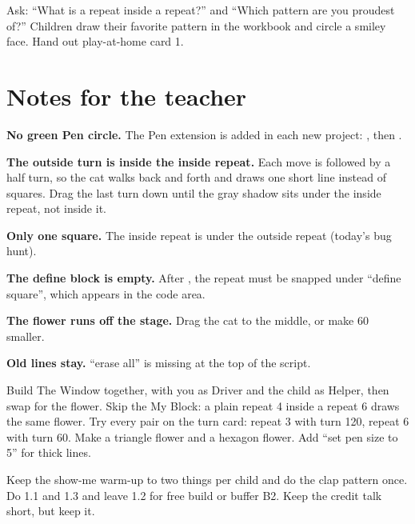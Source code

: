 \begin{reflection}
Ask: \enquote{What is a repeat inside a repeat?} and \enquote{Which pattern are you proudest of?} Children draw their favorite pattern in the workbook and circle a smiley face. Hand out play-at-home card 1.
\end{reflection}

\section{Notes for the teacher}
\begin{commonmistakes}
  \item \textbf{No green Pen circle.} The Pen extension is added in each new project: , then .
  \item \textbf{The outside turn is inside the inside repeat.} Each move is followed by a half turn, so the cat walks back and forth and draws one short line instead of squares. Drag the last turn down until the gray shadow sits under the inside repeat, not inside it.
  \item \textbf{Only one square.} The inside repeat is under the outside repeat (today's bug hunt).
  \item \textbf{The define block is empty.} After , the repeat must be snapped under \enquote{define square}, which appears in the code area.
  \item \textbf{The flower runs off the stage.} Drag the cat to the middle, or make 60 smaller.
  \item \textbf{Old lines stay.} \enquote{erase all} is missing at the top of the script.
\end{commonmistakes}

\begin{differentiation}
\supportpath Build The Window together, with you as Driver and the child as Helper, then swap for the flower. Skip the My Block: a plain repeat 4 inside a repeat 6 draws the same flower.
\extensionpath Try every pair on the turn card: repeat 3 with turn 120, repeat 6 with turn 60. Make a triangle flower and a hexagon flower. Add \enquote{set pen size to 5} for thick lines.
\end{differentiation}

\begin{teachernote}
Keep the show-me warm-up to two things per child and do the clap pattern once. Do 1.1 and 1.3 and leave 1.2 for free build or buffer B2. Keep the credit talk short, but keep it.
\end{teachernote}
